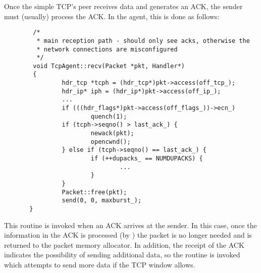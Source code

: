Once the simple TCP's peer receives data and generates an ACK, the
sender must (usually) process the ACK.
In the  agent, this is done as follows:
\begin{small}
\begin{verbatim}
        /*
         * main reception path - should only see acks, otherwise the
         * network connections are misconfigured
         */
        void TcpAgent::recv(Packet *pkt, Handler*)
        {
                hdr_tcp *tcph = (hdr_tcp*)pkt->access(off_tcp_);
                hdr_ip* iph = (hdr_ip*)pkt->access(off_ip_);
                ...
                if (((hdr_flags*)pkt->access(off_flags_))->ecn_)
                        quench(1);
                if (tcph->seqno() > last_ack_) {
                        newack(pkt);
                        opencwnd();
                } else if (tcph->seqno() == last_ack_) {
                        if (++dupacks_ == NUMDUPACKS) {
                                ...
                        }
                }
                Packet::free(pkt);
                send(0, 0, maxburst_);
       }
\end{verbatim}
\end{small}
This routine is invoked when an ACK arrives at the sender.
In this case, once the information in the ACK is processed (by )
the packet is no longer needed and is returned to the packet memory
allocator.
In addition, the receipt of the ACK indicates the possibility of sending
additional data, so the  routine is
invoked which attempts to send more data if the TCP window allows.

\subsubsection{}

